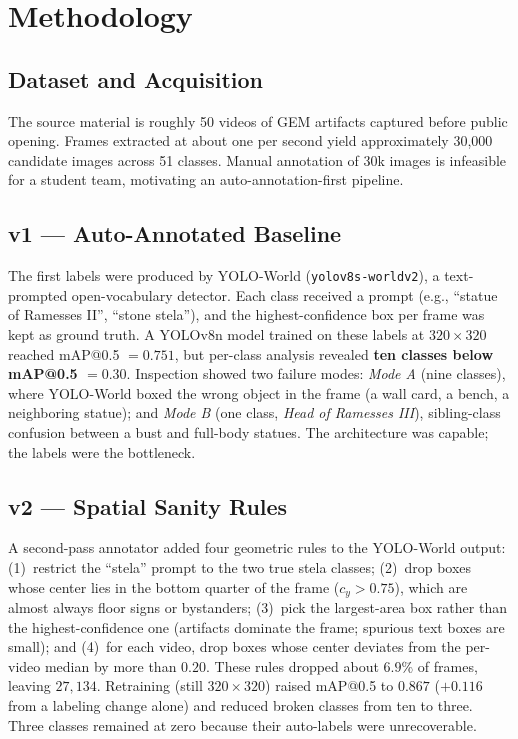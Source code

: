 \section{Methodology}

\subsection{Dataset and Acquisition}
The source material is roughly 50 videos of GEM artifacts captured before public
opening. Frames extracted at about one per second yield approximately 30{,}000
candidate images across 51 classes. Manual annotation of 30k images is infeasible for
a student team, motivating an auto-annotation-first pipeline.

\subsection{v1 --- Auto-Annotated Baseline}
The first labels were produced by YOLO-World (\texttt{yolov8s-worldv2})\citep{yoloworld},
a text-prompted open-vocabulary detector. Each class received a prompt (e.g., ``statue
of Ramesses II'', ``stone stela''), and the highest-confidence box per frame was kept
as ground truth. A YOLOv8n model trained on these labels at $320\times320$ reached
mAP@0.5 $=0.751$, but per-class analysis revealed \textbf{ten classes below mAP@0.5
$=0.30$}. Inspection showed two failure modes: \emph{Mode A} (nine classes), where
YOLO-World boxed the wrong object in the frame (a wall card, a bench, a neighboring
statue); and \emph{Mode B} (one class, \emph{Head of Ramesses III}), sibling-class
confusion between a bust and full-body statues. The architecture was capable; the
labels were the bottleneck.

\subsection{v2 --- Spatial Sanity Rules}
A second-pass annotator added four geometric rules to the YOLO-World output:
(1)~restrict the ``stela'' prompt to the two true stela classes; (2)~drop boxes whose
center lies in the bottom quarter of the frame ($c_y>0.75$), which are almost always
floor signs or bystanders; (3)~pick the largest-area box rather than the
highest-confidence one (artifacts dominate the frame; spurious text boxes are small);
and (4)~for each video, drop boxes whose center deviates from the per-video median by
more than $0.20$. These rules dropped about $6.9\%$ of frames, leaving $27{,}134$.
Retraining (still $320\times320$) raised mAP@0.5 to $0.867$ ($+0.116$ from a labeling
change alone) and reduced broken classes from ten to three. Three classes remained at
zero because their auto-labels were unrecoverable.

